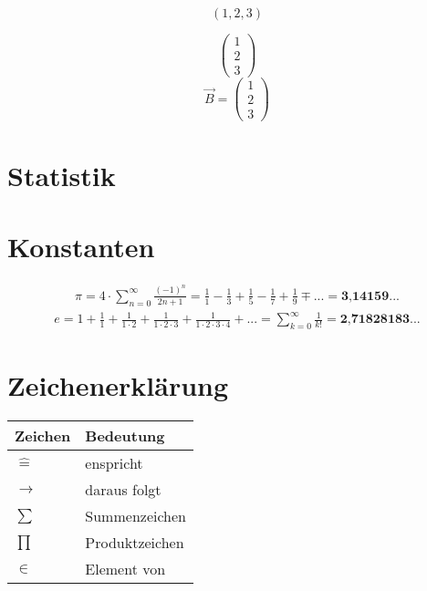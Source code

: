 \documentclass[12pt,a4paper,fleqn,twoside,pdf,final]{article}
\begin{document}
\newcommand*{\rowvec}[1]{\left( #1\right)}
\newcommand*{\rowvecVert}[1]{\left(\begin{array}{c}#1\end{array}\right)}

$$
\rowvec{1,2,3}
$$

$$
\left( 
\begin{array}{c}
1 \\ 2 \\ 3
\end{array}
\right)
$$
$$
\vec{B} = \rowvecVert{1 \\ 2 \\ 3}
$$

\section{Statistik}

\section{Konstanten}
\begin{align*} 
\pi =  4 \cdot \sum_{n=0}^\infty  \frac{(-1)^n}{2n+1} = \frac{1}{1} -  \frac{1}{3} +  \frac{1}{5} -  \frac{1}{7} + \frac{1}{9} \mp ... = \textbf{3,14159}...
\end{align*}
\begin{align*} 
e = 1 + \frac{1}{1}+\frac{1}{1 \cdot 2}+\frac{1}{1 \cdot 2  \cdot 3}+\frac{1}{1 \cdot 2  \cdot 3  \cdot 4}+... = \sum_{k=0}^\infty \frac{1}{k!} = \textbf{2,71828183}...
\end{align*}


\section{Zeichenerklärung}

\begin{tabular}[h]{l|l}
Zeichen &Bedeutung  \\
\hline
$\widehat{=}$ & enspricht  \\
$\longrightarrow$ & daraus folgt \\
$\sum$ & Summenzeichen \\
$\prod$ & Produktzeichen \\
$ \in$ & Element von \\
\end{tabular}
\end{document}

